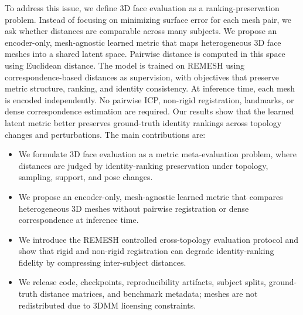 \documentclass{article}
\begin{document}
To address this issue, we define 3D face evaluation as a ranking-preservation problem. Instead of focusing on minimizing surface error for each mesh pair, we ask whether distances are comparable across many subjects. We propose an encoder-only, mesh-agnostic learned metric that maps heterogeneous 3D face meshes into a shared latent space. Pairwise distance is computed in this space using Euclidean distance. The model is trained on REMESH using correspondence-based distances as supervision, with objectives that preserve metric structure, ranking, and identity consistency. At inference time, each mesh is encoded independently. No pairwise ICP, non-rigid registration, landmarks, or dense correspondence estimation are required. Our results show that the learned latent metric better preserves ground-truth identity rankings across topology changes and perturbations. The main contributions are:
\begin{itemize}
\item We formulate 3D face evaluation as a metric meta-evaluation problem, where distances
are judged by identity-ranking preservation under topology, sampling, support,
and pose changes.
\item We propose an encoder-only, mesh-agnostic learned metric that compares
heterogeneous 3D meshes without pairwise registration or dense correspondence at
inference time.
\item We introduce the REMESH controlled cross-topology evaluation protocol and
show that rigid and non-rigid registration can degrade identity-ranking fidelity
by compressing inter-subject distances.
\item We release code, checkpoints, reproducibility artifacts, subject splits,
ground-truth distance matrices, and benchmark metadata; meshes are not
redistributed due to 3DMM licensing constraints.
\end{itemize}
\end{document}

